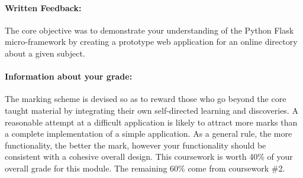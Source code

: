 \documentclass[letterpaper,11pt]{../resources/texMemo}
\begin{document}
\maketitle

\paragraph{Written Feedback:} The core objective was to demonstrate your understanding of the Python Flask micro-framework by creating a prototype web application for an online directory about a given subject.






\paragraph{Information about your grade:} The marking scheme is devised so as to reward those who go beyond the core taught material by integrating their own self-directed learning and discoveries. A reasonable attempt at a difficult application is likely to attract more marks than a complete implementation of a simple application. As a general rule, the more functionality, the better the mark, however your functionality should be consistent with a cohesive overall design. This coursework is worth 40\% of your overall grade for this module. The remaining 60\% come from coursework \#2.
\end{document}
